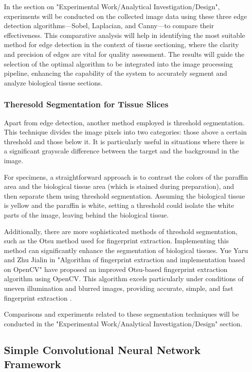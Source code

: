 In the section on "Experimental Work/Analytical Investigation/Design", experiments will be conducted on the collected image data using these three edge detection algorithms—Sobel, Laplacian, and Canny—to compare their effectiveness. This comparative analysis will help in identifying the most suitable method for edge detection in the context of tissue sectioning, where the clarity and precision of edges are vital for quality assessment. The results will guide the selection of the optimal algorithm to be integrated into the image processing pipeline, enhancing the capability of the system to accurately segment and analyze biological tissue sections.

\subsubsection{Theresold Segmentation for Tissue Slices}

Apart from edge detection, another method employed is threshold segmentation. This technique divides the image pixels into two categories: those above a certain threshold and those below it. It is particularly useful in situations where there is a significant grayscale difference between the target and the background in the image.

For specimens, a straightforward approach is to contrast the colors of the paraffin area and the biological tissue area (which is stained during preparation), and then separate them using threshold segmentation. Assuming the biological tissue is yellow and the paraffin is white, setting a threshold could isolate the white parts of the image, leaving behind the biological tissue.

Additionally, there are more sophisticated methods of threshold segmentation, such as the Otsu method used for fingerprint extraction. Implementing this method can significantly enhance the segmentation of biological tissues. Yue Yaru and Zhu Jialin in "Algorithm of fingerprint extraction and implementation based on OpenCV" have proposed an improved Otsu-based fingerprint extraction algorithm using OpenCV. This algorithm excels particularly under conditions of uneven illumination and blurred images, providing accurate, simple, and fast fingerprint extraction \cite{3.3}.

Comparisons and experiments related to these segmentation techniques will be conducted in the "Experimental Work/Analytical Investigation/Design" section.

\subsection{Simple Convolutional Neural Network Framework}

